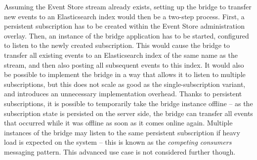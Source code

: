 Assuming the Event Store stream already exists, setting up the bridge to transfer new events to an Elasticsearch index would then be a two-step process.
First, a persistent subscription has to be created within the Event Store administration overlay.
Then, an instance of the bridge application has to be started, configured to listen to the newly created subscription.
This would cause the bridge to transfer all existing events to an Elasticsearch index of the same name as the stream, and then also posting all subsequent events to this index.
It would also be possible to implement the bridge in a way that allows it to listen to multiple subscriptions, but this does not scale as good\cite{src?} as the single-subscription variant, and introduces an unnecessary implementation overhead.
Thanks to persistent subscriptions, it is possible to temporarily take the bridge instance offline -- as the subscription state is persisted on the server side, the bridge can transfer all events that occurred while it was offline as soon as it comes online again.
Multiple instances of the bridge may listen to the same persistent subscription if heavy load is expected on the system -- this is known as the \emph{competing consumers} messaging pattern\cite{WEB:Microsoft-Competing-Consumers}.
This advanced use case is not considered further though.








































